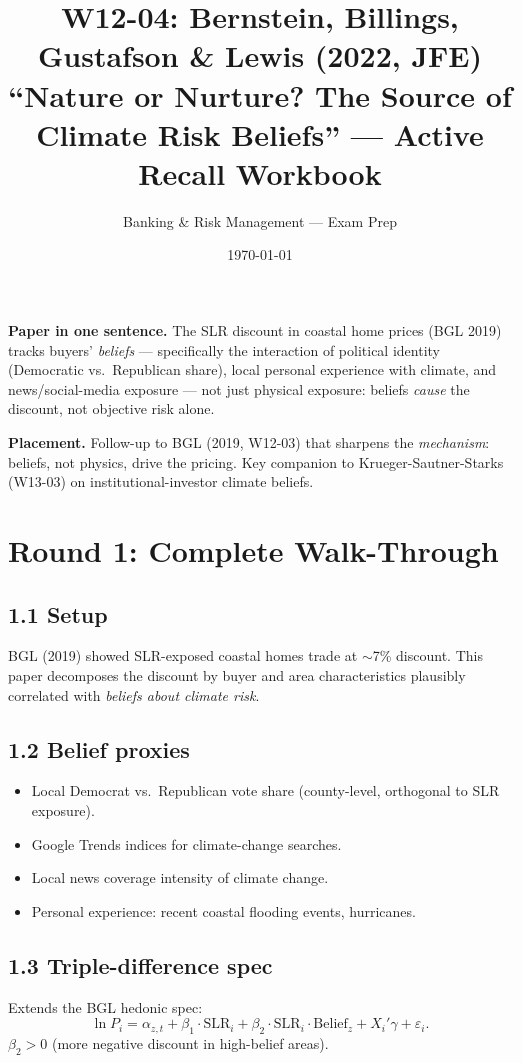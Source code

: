 \documentclass[11pt]{article}
\title{W12-04: Bernstein, Billings, Gustafson \& Lewis (2022, JFE) \\
\large ``Nature or Nurture? The Source of Climate Risk Beliefs'' --- Active Recall Workbook}
\author{Banking \& Risk Management --- Exam Prep}
\date{\today}
\begin{document}
\maketitle

\begin{keybox}
\textbf{Paper in one sentence.} The SLR discount in coastal home prices (BGL 2019) tracks buyers' \emph{beliefs} --- specifically the interaction of political identity (Democratic vs.\ Republican share), local personal experience with climate, and news/social-media exposure --- not just physical exposure: beliefs \emph{cause} the discount, not objective risk alone.

\textbf{Placement.} Follow-up to BGL (2019, W12-03) that sharpens the \emph{mechanism}: beliefs, not physics, drive the pricing. Key companion to Krueger-Sautner-Starks (W13-03) on institutional-investor climate beliefs.
\end{keybox}

\section*{Round 1: Complete Walk-Through}

\subsection*{1.1 Setup}
BGL (2019) showed SLR-exposed coastal homes trade at $\sim$7\% discount. This paper decomposes the discount by buyer and area characteristics plausibly correlated with \emph{beliefs about climate risk}.

\subsection*{1.2 Belief proxies}
\begin{itemize}
\item Local Democrat vs.\ Republican vote share (county-level, orthogonal to SLR exposure).
\item Google Trends indices for climate-change searches.
\item Local news coverage intensity of climate change.
\item Personal experience: recent coastal flooding events, hurricanes.
\end{itemize}

\subsection*{1.3 Triple-difference spec}
Extends the BGL hedonic spec:
\[
\ln P_i = \alpha_{z,t} + \beta_1\cdot\text{SLR}_i + \beta_2\cdot\text{SLR}_i\cdot\text{Belief}_z + X_i'\gamma + \varepsilon_i.
\]
$\beta_2>0$ (more negative discount in high-belief areas).
\end{document}
